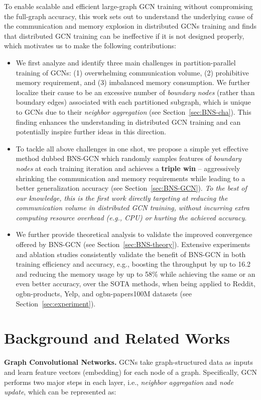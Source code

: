 \documentclass{article}
\newcommand{\niparagraph}[1]{\noindent\textbf{#1}}
\begin{document}
To enable scalable and efficient large-graph GCN training without compromising the full-graph accuracy, this work sets out to understand the underlying cause of the communication and memory explosion in distributed GCNs training 
and finds that distributed GCN training can be ineffective if it is not designed properly, 
which motivates us to make the following contributions:
\begin{itemize}

   \item We first analyze and identify three main challenges in partition-parallel training of GCNs: (1) overwhelming communication volume, (2) prohibitive memory requirement, and (3) imbalanced memory consumption. 
   We further localize their cause to be an excessive number of \textit{boundary nodes} (rather than boundary edges) associated with each partitioned subgraph, which is unique to GCNs due to their \textit{neighbor aggregation} (see Section~\ref{sec:BNS-cha}).
	This finding enhances the understanding in distributed GCN training and can potentially inspire further ideas in this direction. 
	
	\item To tackle all above challenges in one shot, we propose a simple yet effective method dubbed BNS-GCN which 
	randomly samples features of \textit{boundary nodes} at each training iteration and achieves a \textbf{triple win} -- aggressively shrinking the communication and memory requirements while leading to a better generalization accuracy (see Section~\ref{sec:BNS-GCN}). 
	\textit{To the best of our knowledge, this is the first work directly targeting at reducing the communication volume in distributed GCN training, without incurring extra computing resource overhead (e.g., CPU) or hurting the achieved accuracy}.

	
	\item We further provide theoretical analysis to validate the improved convergence offered by BNS-GCN (see Section~\ref{sec:BNS-theory}). 
	Extensive experiments and ablation studies consistently validate the benefit of BNS-GCN in both training efficiency and accuracy, e.g., boosting the throughput by up to 16.2 and reducing the memory usage by up to 58\% while achieving the same or an even better accuracy, over the SOTA methods, when being applied to Reddit, ogbn-products, Yelp, and ogbn-papers100M datasets (see Section~\ref{sec:experiment}).
\end{itemize}

 \section{Background and Related Works}
\niparagraph{Graph Convolutional Networks.}
GCNs take graph-structured data as inputs and learn feature vectors (embedding) for each node of a graph.
Specifically,
GCN performs two major steps in each layer, i.e., \textit{neighbor aggregation} and \textit{node update}, which can be represented as:
\end{document}
